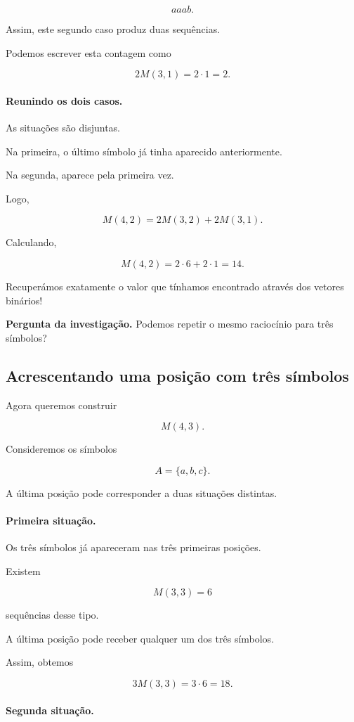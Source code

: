 \documentclass[11pt,a4paper,oneside]{book}
\newcommand{\Pergunta}[1]{\begin{perguntabox}\textbf{Pergunta da investigação.} #1\end{perguntabox}}
\begin{document}
\[
aaab.
\]

Assim, este segundo caso produz
duas sequências.

Podemos escrever esta contagem como

\[
2M(3,1)=2\cdot1=2.
\]

\paragraph{Reunindo os dois casos.}

As situações são disjuntas.

Na primeira, o último símbolo
já tinha aparecido anteriormente.

Na segunda, aparece pela primeira vez.

Logo,

\[
M(4,2)=2M(3,2)+2M(3,1).
\]

Calculando,

\[
M(4,2)=2\cdot6+2\cdot1=14.
\]

Recuperámos exatamente o valor
que tínhamos encontrado através
dos vetores binários!

\Pergunta{Podemos repetir o mesmo raciocínio
para três símbolos?}

\subsection*{Acrescentando uma posição com três símbolos}

Agora queremos construir

\[
M(4,3).
\]

Consideremos os símbolos

\[
A=\{a,b,c\}.
\]

A última posição pode corresponder
a duas situações distintas.

\paragraph{Primeira situação.}

Os três símbolos já apareceram
nas três primeiras posições.

Existem

\[
M(3,3)=6
\]

sequências desse tipo.

A última posição pode receber
qualquer um dos três símbolos.

Assim, obtemos

\[
3M(3,3)=3\cdot6=18.
\]

\paragraph{Segunda situação.}
\end{document}
